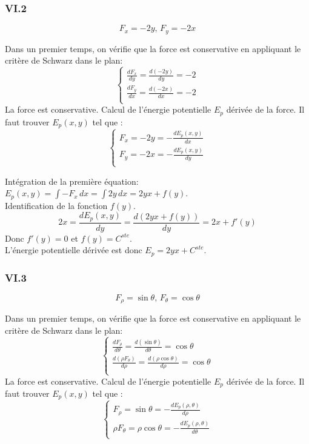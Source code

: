 \documentclass[]{book}
\theoremstyle{definition}
\begin{document}
\subsubsection*{VI.2}
$$F_x = -2y,\, F_y = -2x$$

Dans un premier temps, on v\'erifie que la force est conservative en appliquant le crit\`ere de Schwarz dans le plan:
$$
\left\{
\begin{array}{l }
	\frac{dF_x}{dy} = \frac{d(-2y)}{dy} = -2\\
	\frac{dF_y}{dx} = \frac{d(-2x)}{dx} = -2\\
\end{array}
\right. 
$$
La force est conservative. Calcul de l'\'energie potentielle $E_p$ d\'eriv\'ee de la force. Il faut trouver $E_p(x,y)$ tel que :
$$
\left\{
\begin{array}{l }
	F_x = -2y = -\frac{dE_p(x,y)}{dx} \\
	F_y =  -2x = -\frac{dE_p(x,y)}{dy} \\
\end{array}
\right. 
$$

Int\'egration de la premi\`ere \'equation: $E_p(x,y) = \int{-F_x\, dx} = \int{2y\, dx} = 2yx + f(y)$.\\
Identification de la fonction $f(y)$. 
$$2x = \frac{dE_p(x,y)}{dy} = \frac{d(2yx+f(y))}{dy} = 2x+f'(y)$$
Donc $f'(y) = 0$ et $f(y) = C^{ste}$.\\

L'\'energie potentielle d\'eriv\'ee est donc $E_p = 2yx + C^{ste}$.

\subsubsection*{VI.3}
$$F_{\rho} = \sin \theta,\, F_{\theta} = \cos \theta$$

Dans un premier temps, on v\'erifie que la force est conservative en appliquant le crit\`ere de Schwarz dans le plan:
$$
\left\{
\begin{array}{l }
	\frac{dF_{\rho}}{d\theta} = \frac{d(\sin \theta)}{d\theta} = \cos \theta\\
	\frac{d(\rho F_{\theta})}{d\rho} = \frac{d(\rho \cos \theta)}{d\rho} = \cos \theta\\
\end{array}
\right. 
$$
La force est conservative. Calcul de l'\'energie potentielle $E_p$ d\'eriv\'ee de la force. Il faut trouver $E_p(x,y)$ tel que :
$$
\left\{
\begin{array}{l }
	F_{\rho} = \sin \theta = -\frac{dE_p(\rho,\theta)}{d\rho} \\
	\rho F_{\theta} =  \rho \cos \theta = -\frac{dE_p(\rho,\theta)}{d\theta} \\
\end{array}
\right. 
$$
\end{document}
